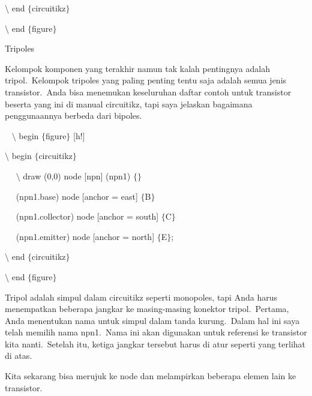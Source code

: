 \noindent 
 $\setminus$ end $ \{ $circuitikz$ \} $
\par


\noindent 
 $\setminus$ end $ \{ $figure$ \} $ 
\par


\noindent 
Tripoles
\par


\noindent 
Kelompok komponen yang terakhir namun tak kalah pentingnya adalah tripol. Kelompok tripoles yang paling penting tentu saja adalah semua jenis transistor. Anda bisa menemukan keseluruhan daftar contoh untuk transistor beserta yang ini di manual circuitikz, tapi saya jelaskan bagaimana penggunaannya berbeda dari bipoles.
\par


\noindent 
~ $\setminus$ begin $ \{ $figure$ \} $ [h!]
\par


\noindent 
 $\setminus$ begin $ \{ $circuitikz$ \} $
\par


\noindent 
~~ $\setminus$ draw (0,0) node [npn] (npn1) $ \{ $$ \} $
\par


\noindent 
~~ (npn1.base) node [anchor = east] $ \{ $B$ \} $
\par


\noindent 
~~ (npn1.collector) node [anchor = south] $ \{ $C$ \} $
\par


\noindent 
~~ (npn1.emitter) node [anchor = north] $ \{ $E$ \} $;
\par


\noindent 
 $\setminus$ end $ \{ $circuitikz$ \} $
\par


\noindent 
 $\setminus$ end $ \{ $figure$ \} $ 
\par


\noindent 
Tripol adalah simpul dalam circuitikz seperti monopoles, tapi Anda harus menempatkan beberapa jangkar ke masing-masing konektor tripol. Pertama, Anda menentukan nama untuk simpul dalam tanda kurung. Dalam hal ini saya telah memilih nama npn1. Nama ini akan digunakan untuk referensi ke transistor kita nanti. Setelah itu, ketiga jangkar tersebut harus di atur seperti yang terlihat di atas.
\par


\noindent 
Kita sekarang bisa merujuk ke node dan melampirkan beberapa elemen lain ke transistor.
\par


